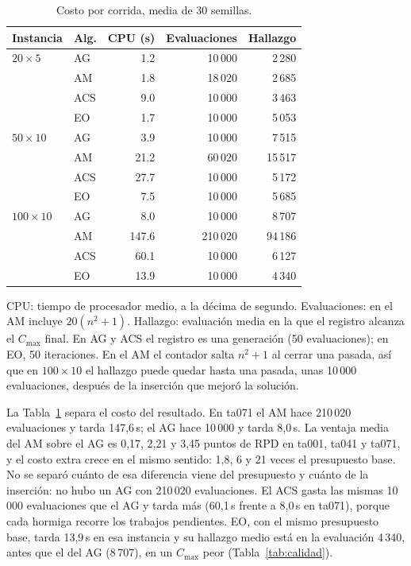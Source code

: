 \documentclass[journal]{IEEEtran}
\newcounter{lin}\newcommand{\li}{\stepcounter{lin}\thelin:\ }
\newcommand{\notatabla}[1]{\par\vspace{4pt}\colorbox{gray!12}{\parbox{\dimexpr\linewidth-2\fboxsep\relax}{\footnotesize\raggedright #1}}}
\begin{document}
\begin{table}[!t]
  \caption{Costo por corrida, media de 30 semillas.}\label{tab:tiempo}
  \centering\footnotesize
  \begin{tabular}{l l r r r}\hline
    Instancia & Alg. & CPU (s) & Evaluaciones & Hallazgo\\ \hline
    $20\times5$ & AG & 1.2 & 10\,000 & 2\,280\\
    & AM & 1.8 & 18\,020 & 2\,685\\
    & ACS & 9.0 & 10\,000 & 3\,463\\
    & EO & 1.7 & 10\,000 & 5\,053\\ \hline
    $50\times10$ & AG & 3.9 & 10\,000 & 7\,515\\
    & AM & 21.2 & 60\,020 & 15\,517\\
    & ACS & 27.7 & 10\,000 & 5\,172\\
    & EO & 7.5 & 10\,000 & 5\,685\\ \hline
    $100\times10$ & AG & 8.0 & 10\,000 & 8\,707\\
    & AM & 147.6 & 210\,020 & 94\,186\\
    & ACS & 60.1 & 10\,000 & 6\,127\\
    & EO & 13.9 & 10\,000 & 4\,340\\ \hline
  \end{tabular}
  \notatabla{CPU: tiempo de procesador medio, a la décima de segundo. Evaluaciones: en el AM incluye $20(n^2+1)$. Hallazgo: evaluación media en la que el registro alcanza el $C_{\max}$ final. En AG y ACS el registro es una generación (50 evaluaciones); en EO, 50 iteraciones. En el AM el contador salta $n^2+1$ al cerrar una pasada, así que en $100\times10$ el hallazgo puede quedar hasta una pasada, unas 10\,000 evaluaciones, después de la inserción que mejoró la solución.}
\end{table}

La Tabla~\ref{tab:tiempo} separa el costo del resultado. En ta071 el AM hace 210\,020 evaluaciones y tarda 147,6\,s; el AG hace 10\,000 y tarda 8,0\,s. La ventaja media del AM sobre el AG es 0,17, 2,21 y 3,45 puntos de RPD en ta001, ta041 y ta071, y el costo extra crece en el mismo sentido: 1,8, 6 y 21 veces el presupuesto base. No se separó cuánto de esa diferencia viene del presupuesto y cuánto de la inserción: no hubo un AG con 210\,020 evaluaciones. El ACS gasta las mismas 10\,000 evaluaciones que el AG y tarda más (60,1\,s frente a 8,0\,s en ta071), porque cada hormiga recorre los trabajos pendientes. EO, con el mismo presupuesto base, tarda 13,9\,s en esa instancia y su hallazgo medio está en la evaluación 4\,340, antes que el del AG (8\,707), en un $C_{\max}$ peor (Tabla~\ref{tab:calidad}).
\end{document}
